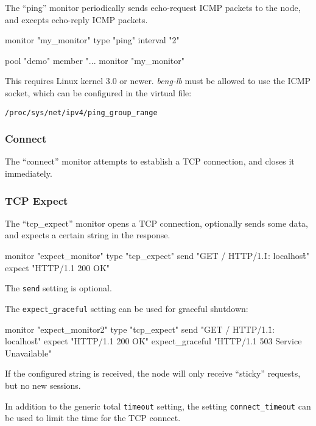 \documentclass[a4paper,12pt]{article}
\begin{document}
The ``ping'' monitor periodically sends echo-request ICMP packets to
the node, and excepts echo-reply ICMP packets.

\begin{verbatim*}
monitor "my_monitor" {
  type "ping"
  interval "2"
}

pool "demo" {
  member "...
  monitor "my_monitor"
}
\end{verbatim*}

This requires Linux kernel 3.0 or newer.  \emph{beng-lb} must be
allowed to use the ICMP socket, which can be configured in the virtual
file:

\texttt{/proc/sys/net/ipv4/ping\_group\_range}

\subsubsection{Connect}

The ``connect'' monitor attempts to establish a TCP connection, and
closes it immediately.

\subsubsection{TCP Expect}

The ``tcp\_expect'' monitor opens a TCP connection, optionally sends
some data, and expects a certain string in the response.

\begin{verbatim*}
monitor "expect_monitor" {
  type "tcp_expect"
  send "GET / HTTP/1.1\r\nHost: localhost\r\n\r\n"
  expect "HTTP/1.1 200 OK"
}
\end{verbatim*}

The \texttt{send} setting is optional.

The \verb|expect_graceful| setting can be used for graceful shutdown:

\begin{verbatim*}
monitor "expect_monitor2" {
  type "tcp_expect"
  send "GET / HTTP/1.1\r\nHost: localhost\r\n\r\n"
  expect "HTTP/1.1 200 OK"
  expect_graceful "HTTP/1.1 503 Service Unavailable"
}
\end{verbatim*}

If the configured string is received, the node will only receive
``sticky'' requests, but no new sessions.

In addition to the generic total \verb|timeout| setting, the setting
\verb|connect_timeout| can be used to limit the time for the TCP
connect.
\end{document}

